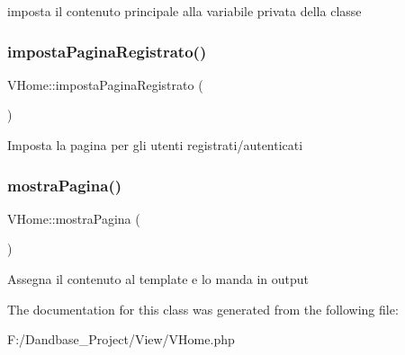 imposta il contenuto principale alla variabile privata della classe \mbox{\label{class_v_home_ace9a51c09e9346c6e508d5f67c8ba6d0}} 
\subsubsection{\texorpdfstring{imposta\+Pagina\+Registrato()}{impostaPaginaRegistrato()}}
{\footnotesize\ttfamily V\+Home\+::imposta\+Pagina\+Registrato (\begin{DoxyParamCaption}{ }\end{DoxyParamCaption})}

Imposta la pagina per gli utenti registrati/autenticati \mbox{\label{class_v_home_a72414d19f9cddd5682f160cb9b31344c}} 
\subsubsection{\texorpdfstring{mostra\+Pagina()}{mostraPagina()}}
{\footnotesize\ttfamily V\+Home\+::mostra\+Pagina (\begin{DoxyParamCaption}{ }\end{DoxyParamCaption})}

Assegna il contenuto al template e lo manda in output 

The documentation for this class was generated from the following file\+:\begin{DoxyCompactItemize}
\item 
F\+:/\+Dandbase\+\_\+\+Project/\+View/V\+Home.\+php\end{DoxyCompactItemize}
